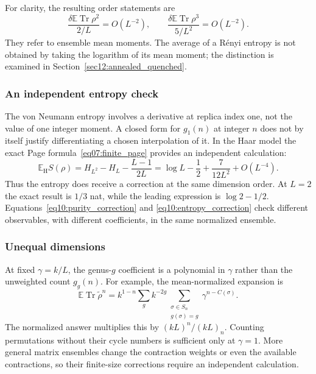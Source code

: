 \documentclass[11pt,letterpaper]{article}
\theoremstyle{plain}
\theoremstyle{definition}
\theoremstyle{remark}
\begin{document}
For clarity, the resulting order statements are
\begin{equation}
 \frac{\delta\mathbb E\operatorname{Tr}\rho^2}
 {2/L}=O(L^{-2}),\qquad
 \frac{\delta\mathbb E\operatorname{Tr}\rho^3}
 {5/L^2}=O(L^{-2}).
 \label{eq10:sensitivity_ordering}
\end{equation}
They refer to ensemble mean moments.  The average of a R\'enyi entropy is
not obtained by taking the logarithm of its mean moment; the distinction is
examined in Section~\ref{sec12:annealed_quenched}.

\subsubsection{An independent entropy check}
The von Neumann entropy involves a derivative at replica index one, not the
value of one integer moment.  A closed form for $g_1(n)$ at integer $n$ does
not by itself justify differentiating a chosen interpolation of it.  In the
Haar model the exact Page formula~\eqref{eq07:finite_page} provides an
independent calculation:
\begin{equation}
 \mathbb E_{\mathrm H}S(\rho)
 =H_{L^2}-H_L-\frac{L-1}{2L}
 =\log L-\frac12+\frac{7}{12L^2}+O(L^{-4}).
 \label{eq10:entropy_correction}
\end{equation}
Thus the entropy does receive a correction at the same dimension order.
At $L=2$ the exact result is $1/3$ nat, while the leading expression is
$\log2-1/2$.  Equations~\eqref{eq10:purity_correction} and
\eqref{eq10:entropy_correction} check different observables, with different
coefficients, in the same normalized ensemble.

\subsubsection{Unequal dimensions}
At fixed $\gamma=k/L$, the genus-$g$ coefficient is a polynomial in
$\gamma$ rather than the unweighted count $g_g(n)$.  For example, the
mean-normalized expansion is
\begin{equation}
 \mathbb E\operatorname{Tr}\widetilde\rho^n
 =k^{1-n}\sum_g k^{-2g}
 \sum_{\substack{\sigma\in S_n\\g(\sigma)=g}}
 \gamma^{n-C(\sigma)}.
 \label{eq10:unequal_dimensions}
\end{equation}
The normalized answer multiplies this by $(kL)^n/(kL)_n$.
Counting permutations without their cycle numbers is sufficient only at
$\gamma=1$.  More general matrix ensembles change the contraction weights
or even the available contractions, so their finite-size corrections require
an independent calculation.
\end{document}
